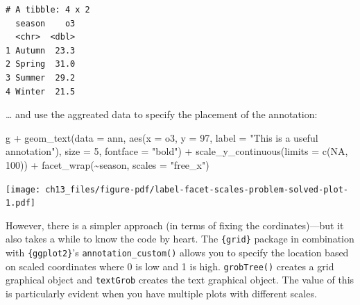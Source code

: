 \documentclass[
  letterpaper,
  DIV=11,
  numbers=noendperiod]{scrreprt}
\newenvironment{Shaded}{\begin{snugshade}}{\end{snugshade}}
\newcommand{\AttributeTok}[1]{\textcolor[rgb]{0.40,0.45,0.13}{#1}}
\newcommand{\ConstantTok}[1]{\textcolor[rgb]{0.56,0.35,0.01}{#1}}
\newcommand{\DecValTok}[1]{\textcolor[rgb]{0.68,0.00,0.00}{#1}}
\newcommand{\FunctionTok}[1]{\textcolor[rgb]{0.28,0.35,0.67}{#1}}
\newcommand{\NormalTok}[1]{\textcolor[rgb]{0.00,0.23,0.31}{#1}}
\newcommand{\SpecialCharTok}[1]{\textcolor[rgb]{0.37,0.37,0.37}{#1}}
\newcommand{\StringTok}[1]{\textcolor[rgb]{0.13,0.47,0.30}{#1}}
\begin{document}
\begin{verbatim}
# A tibble: 4 x 2
  season    o3
  <chr>  <dbl>
1 Autumn  23.3
2 Spring  31.0
3 Summer  29.2
4 Winter  21.5
\end{verbatim}

\ldots{} and use the aggreated data to specify the placement of the
annotation:

\begin{Shaded}
\begin{Highlighting}[]
\NormalTok{g }\SpecialCharTok{+}
  \FunctionTok{geom\_text}\NormalTok{(}\AttributeTok{data =}\NormalTok{ ann,}
            \FunctionTok{aes}\NormalTok{(}\AttributeTok{x =}\NormalTok{ o3, }\AttributeTok{y =} \DecValTok{97}\NormalTok{,}
                \AttributeTok{label =} \StringTok{"This is a useful annotation"}\NormalTok{),}
            \AttributeTok{size =} \DecValTok{5}\NormalTok{, }\AttributeTok{fontface =} \StringTok{"bold"}\NormalTok{) }\SpecialCharTok{+}
  \FunctionTok{scale\_y\_continuous}\NormalTok{(}\AttributeTok{limits =} \FunctionTok{c}\NormalTok{(}\ConstantTok{NA}\NormalTok{, }\DecValTok{100}\NormalTok{)) }\SpecialCharTok{+}
  \FunctionTok{facet\_wrap}\NormalTok{(}\SpecialCharTok{\textasciitilde{}}\NormalTok{season, }\AttributeTok{scales =} \StringTok{"free\_x"}\NormalTok{)}
\end{Highlighting}
\end{Shaded}

\texttt{[image: ch13\_files/figure-pdf/label-facet-scales-problem-solved-plot-1.pdf]}

However, there is a simpler approach (in terms of fixing the
cordinates)---but it also takes a while to know the code by heart. The
\texttt{\{grid\}} package in combination with \texttt{\{ggplot2\}}'s
\texttt{annotation\_custom()} allows you to specify the location based
on scaled coordinates where 0 is low and 1 is high. \texttt{grobTree()}
creates a grid graphical object and \texttt{textGrob} creates the text
graphical object. The value of this is particularly evident when you
have multiple plots with different scales.
\end{document}
